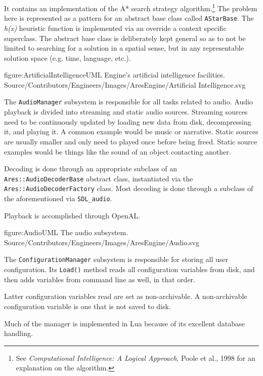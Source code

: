 It contains an implementation of the A* search strategy algorithm.\footnote{See {\it Computational Intelligence: A Logical Approach}, Poole et al., 1998 for an explanation on the algorithm.} The problem here is represented as a pattern for an abstract base class called {\tt AStarBase}. The {\it h(x)} heuristic function is implemented via an override a context specific superclass. The abstract base class is deliberately kept general so as to not be limited to searching for a solution in a spatial sense, but in any representable solution space (e.g. time, language, etc.).

\FullPageDiagram
    {figure:ArtificialIntelligenceUML}
    {Engine's artificial intelligence facilities.}
    {Source/Contributors/Engineers/Images/AresEngine/Artificial Intelligence.svg}

\page
{}
The {\tt AudioManager} subsystem is responsible for all tasks related to audio. Audio playback is divided into streaming and static audio sources. Streaming sources need to be continuously updated by loading new data from disk, decompressing it, and playing it. A common example would be music or narrative. Static sources are usually smaller and only need to played once before being freed. Static source examples would be things like the sound of an object contacting another.

Decoding is done through an appropriate subclass of an {\tt Ares::AudioDecoderBase} abstract class, instantiated via the {\tt Ares::AudioDecoderFactory} class. Most decoding is done through a subclass of the aforementioned via {\tt SDL_audio}.

Playback is accomplished through OpenAL.

\FullPageDiagram
    {figure:AudioUML}
    {The audio subsystem.}
    {Source/Contributors/Engineers/Images/AresEngine/Audio.svg}

\page
{}
The {\tt ConfigurationManager} subsystem is responsible for storing all user configuration. Its {\tt Load()} method reads all configuration variables from disk, and then adds variables from command line as well, in that order. 

Latter configuration variables read are set as non-archivable. A non-archivable configuration variable is one that is not saved to disk.

Much of the manager is implemented in Lua because of its excellent database handling.

